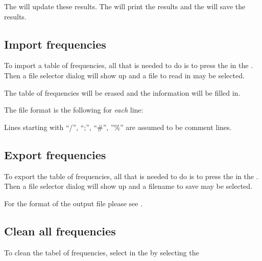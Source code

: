 The  will update these results.
The  will print the results and
the  will save the results.

\subsection{Import frequencies}%
\label{period.import}
To import a table of frequencies, all that is needed to do is
to press the  in the %
. Then a file selector dialog will show up and a file to 
read in may be selected.

The table of frequencies will be erased and the information will be filled
in.

The file format is the following for {\it each} line:

Lines starting with ``/'', ``;'', ``\#'', ''\%''
are assumed to be comment lines.

\subsection{Export frequencies}%
\label{period.export}
To export the table of frequencies, all that is needed to do is
to press the  in the .
Then a file selector dialog will show up and a filename to save
may be selected.

For the format of the output file please see
.

\subsection{Clean all frequencies}%
\label{period.cleanfrequencies}
To clean the tabel of frequencies, select in the  by selecting the 

